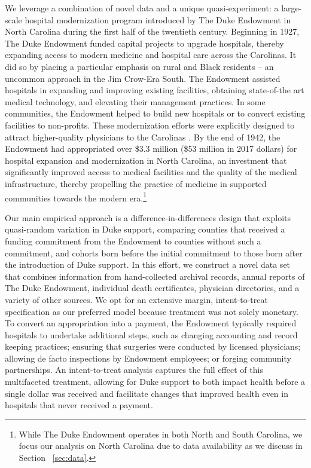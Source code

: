 \documentclass[12pt]{article}
\begin{document}

We leverage a combination of novel data and a unique quasi-experiment: a large-scale hospital modernization program introduced by The Duke Endowment in North Carolina during the first half of the twentieth century.
Beginning in 1927, The Duke Endowment funded capital projects to upgrade hospitals, thereby expanding access to modern medicine and hospital care across the Carolinas. 
It did so by placing a particular emphasis on rural and Black residents -- an uncommon approach in the Jim Crow-Era South.
The Endowment assisted hospitals in expanding and improving existing facilities, obtaining state-of-the art medical technology, and elevating their management practices.
In some communities, the Endowment helped to build new hospitals or to convert existing facilities to non-profits.
These modernization efforts were explicitly designed to attract higher-quality physicians to the Carolinas  . 
By the end of 1942, the Endowment had appropriated over \$3.3 million (\$53 million in 2017 dollars) for hospital expansion and modernization in North Carolina, an investment that significantly improved access to medical facilities and the quality of the medical infrastructure, thereby propelling the practice of medicine in supported communities towards the modern era.\footnote{While The Duke Endowment operates in both North and South Carolina, we focus our analysis on North Carolina due to data availability as we discuss in Section ~\ref{sec:data}.}

Our main empirical approach is a difference-in-differences design that exploits quasi-random variation in Duke support, comparing counties that received a funding commitment from the Endowment to counties without such a commitment, and cohorts born before the initial commitment to those born after the introduction of Duke support.
In this effort, we construct a novel data set that combines information from hand-collected archival records, annual reports of The Duke Endowment, individual death certificates, physician directories, and a variety of other sources.
We opt for an extensive margin, intent-to-treat specification as our preferred model because treatment was not solely monetary.
To convert an appropriation into a payment, the Endowment typically required hospitals to undertake additional steps, such as changing accounting and record keeping practices; ensuring that surgeries were conducted by licensed physicians; allowing de facto inspections by Endowment employees; or forging community partnerships.
An intent-to-treat analysis captures the full effect of this multifaceted treatment, allowing for Duke support to both impact health before a single dollar was received and facilitate changes that improved health even in hospitals that never received a payment.
\end{document}
